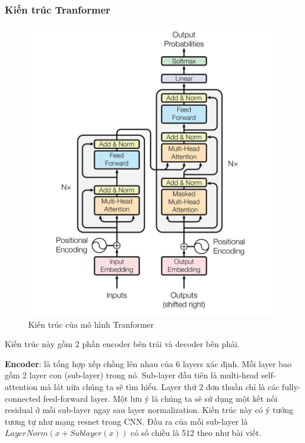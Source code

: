 \subsubsection{Kiến trúc Tranformer}
\begin{figure}[htb]
    \centering
    \includegraphics[width=\textwidth]{image/tranformer-architecture.png}
    \caption{Kiến trúc của mô hình Tranformer}
    \label{figure:tranformer-architecture}
\end{figure}



Kiến trúc này gồm 2 phần encoder bên trái và decoder bên phải.

\textbf{Encoder}: là tổng hợp xếp chồng lên nhau của 6 layers xác định. Mỗi layer bao gồm 2 layer con (sub-layer) trong nó. Sub-layer đầu tiên là multi-head self-attention mà lát nữa chúng ta sẽ tìm hiểu. Layer thứ 2 đơn thuần chỉ là các fully-connected feed-forward layer. Một lưu ý là chúng ta sẽ sử dụng một kết nối residual ở mỗi sub-layer ngay sau layer normalization. Kiến trúc này có ý tưởng tương tự như mạng resnet trong CNN. Đầu ra của mỗi sub-layer là $LayerNorm(x+Sublayer(x))$ có số chiều là 512 theo như bài viết.

